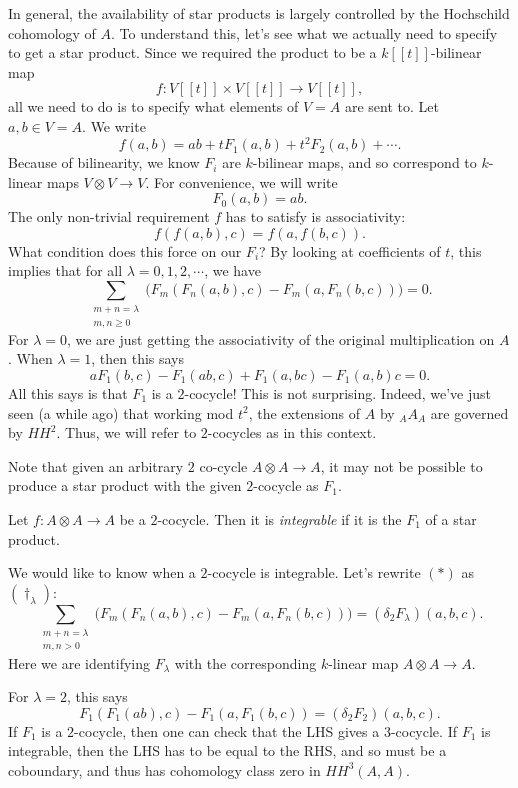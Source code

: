 \documentclass[a4paper]{article}
\newcommand\HH{H\!H}
\begin{document}
In general, the availability of star products is largely controlled by the Hochschild cohomology of $A$. To understand this, let's see what we actually need to specify to get a star product. Since we required the product to be a $k[[t]]$-bilinear map
\[
  f: V[[t]] \times V[[t]] \to V[[t]],
\]
all we need to do is to specify what elements of $V = A$ are sent to. Let $a, b \in V = A$. We write
\[
  f(a, b) = ab + t F_1(a, b) + t^2 F_2(a, b) + \cdots.
\]
Because of bilinearity, we know $F_i$ are $k$-bilinear maps, and so correspond to $k$-linear maps $V \otimes V \to V$. For convenience, we will write
\[
  F_0(a, b) = ab.
\]
The only non-trivial requirement $f$ has to satisfy is associativity:
\[
  f(f(a, b), c) = f(a, f(b, c)).
\]
What condition does this force on our $F_i$? By looking at coefficients of $t$, this implies that for all $\lambda = 0, 1, 2, \cdots$, we have
\[
  \sum_{\substack{m + n = \lambda\\m, n \geq 0}} \Big(F_m(F_n(a, b), c) - F_m(a, F_n(b, c))\Big) = 0.\tag{$*$}
\]
For $\lambda = 0$, we are just getting the associativity of the original multiplication on $A$. When $\lambda = 1$, then this says
\[
  a F_1(b, c) - F_1(ab, c) + F_1(a, bc) - F_1(a, b)c = 0.
\]
All this says is that $F_1$ is a $2$-cocycle! This is not surprising. Indeed, we've just seen (a while ago) that working mod $t^2$, the extensions of $A$ by $_AA_A$ are governed by $\HH^2$. Thus, we will refer to $2$-cocycles as  in this context.

Note that given an arbitrary $2$ co-cycle $A \otimes A \to A$, it may not be possible to produce a star product with the given $2$-cocycle as $F_1$.
\begin{defi}
  Let $f: A \otimes A \to A$ be a $2$-cocycle. Then it is \emph{integrable} if it is the $F_1$ of a star product.
\end{defi}
We would like to know when a $2$-cocycle is integrable. Let's rewrite $(*)$ as $(\dagger_\lambda)$:
\[
  \sum_{\substack{m + n = \lambda\\m, n > 0}}\Big(F_m(F_n(a, b), c) - F_m(a, F_n(b, c))\Big) = (\delta_2 F_\lambda)(a, b, c).\tag{$\dagger_\lambda$}
\]
Here we are identifying $F_\lambda$ with the corresponding $k$-linear map $A \otimes A \to A$.

For $\lambda = 2$, this says
\[
  F_1(F_1(ab), c) - F_1(a, F_1(b, c)) = (\delta_2 F_2)(a, b, c).
\]
If $F_1$ is a $2$-cocycle, then one can check that the LHS gives a $3$-cocycle. If $F_1$ is integrable, then the LHS has to be equal to the RHS, and so must be a coboundary, and thus has cohomology class zero in $\HH^3(A, A)$.
\end{document}
